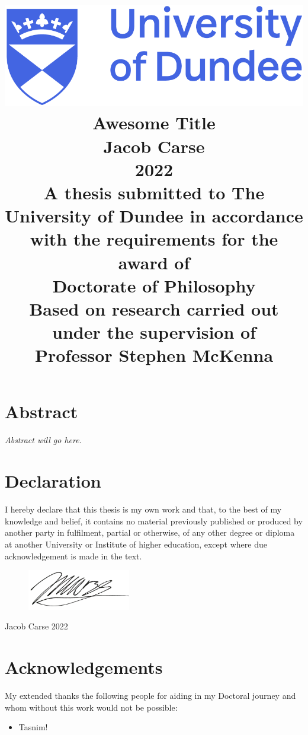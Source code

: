 \documentclass[12pt]{report}
\title{
	{\includegraphics[scale=0.4]{dundee_logo.png}}\\
	\vspace{15mm}
	{Awesome Title}\\
	\vspace{5mm}
	{\Large Jacob Carse}\\
	{\Large 2022}\\
	\vspace{5mm}
	{\normalsize A thesis submitted to The University of Dundee in accordance with the requirements for the award of}\\
	{\large Doctorate of Philosophy}\\
	\vspace{5mm}
	{\normalsize Based on research carried out under the supervision of}\\
	{\large Professor Stephen McKenna}
}
\date{\vspace{-5ex}}
\author{}
\begin{document}
	
	
	\maketitle
	
	\chapter*{Abstract}
	\textit{Abstract will go here.}
	
	\chapter*{Declaration}
	I hereby declare that this thesis is my own work and that, to the best of my knowledge and belief, it contains no material previously published or produced by another party in fulfilment, partial or otherwise, of any other degree or diploma at another University or Institute of higher education, except where due acknowledgement is made in the text.
	
	\vspace{30pt}
	\begin{flushright}
		\begin{figure}[h]
			\begin{flushright}
				\includegraphics[width=0.4\textwidth]{images/signature.png}
			\end{flushright}
		\end{figure}
	
		Jacob Carse
		2022
	
	\end{flushright}

	\chapter*{Acknowledgements}
	My extended thanks the following people for aiding in my Doctoral journey and whom without this work would not be possible:
	
	\begin{itemize}
		\item Tasnim!
	\end{itemize}
\end{document}
